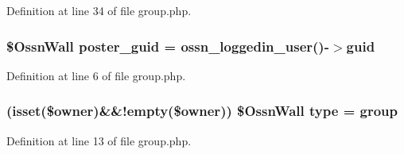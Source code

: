 Definition at line 34 of file group.\+php.

\subsubsection[{\texorpdfstring{poster\+\_\+guid}{poster_guid}}]{\setlength{\rightskip}{0pt plus 5cm}\${\bf Ossn\+Wall} poster\+\_\+guid = {\bf ossn\+\_\+loggedin\+\_\+user}()-\/$>$guid}\hypertarget{_ossn_wall_2actions_2wall_2post_2group_8php_a24eb7b66e353d8983f6f2af979250671}{}\label{_ossn_wall_2actions_2wall_2post_2group_8php_a24eb7b66e353d8983f6f2af979250671}


Definition at line 6 of file group.\+php.

\subsubsection[{\texorpdfstring{type}{type}}]{ (isset(\$owner)\&\&!empty(\$owner)) \${\bf Ossn\+Wall} type = \textquotesingle{}group\textquotesingle{}}\hypertarget{_ossn_wall_2actions_2wall_2post_2group_8php_a2dc1bb4e1ed0029daa81ac0776b14b51}{}\label{_ossn_wall_2actions_2wall_2post_2group_8php_a2dc1bb4e1ed0029daa81ac0776b14b51}


Definition at line 13 of file group.\+php.

